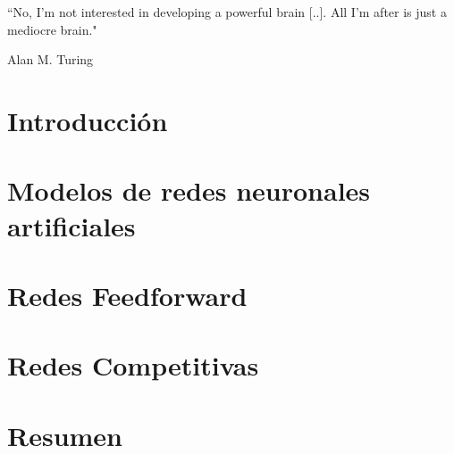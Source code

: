 
\epigraph{``No, I'm not interested in developing a powerful brain [..]. All I'm after is just a mediocre brain."}{Alan M. Turing}

\section{Introducción}

\section{Modelos de redes neuronales artificiales}

\section{Redes Feedforward}

\section{Redes Competitivas}

\section{Resumen}
